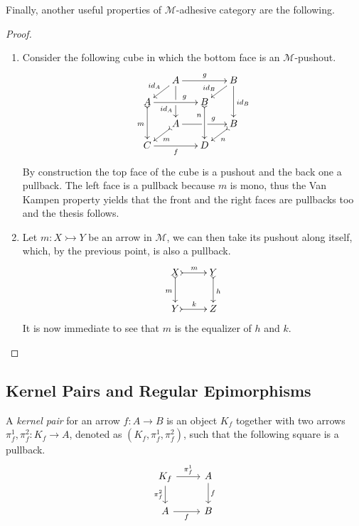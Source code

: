 \documentclass[runningheads,envcountsect]{lipics-v2021}
\def\C{\textbf {\textup{C}}}
\def\X{\textbf {\textup{X}}}
\newcommand{\mto}{\rightarrowtail}
\newcommand{\id}[1]{\mathsf{id}_{#1}}
\begin{document}
Finally, another  useful properties of $\mathcal{M}$-adhesive category are the following.
\begin{proof}
	\begin{enumerate}
		\item  Consider the following cube in which the bottom face is an $\mathcal{M}$-pushout.
		\[\xymatrix@C=15pt@R=9pt{&A\ar[dd]|\hole_(.65){\id{A}}\ar[rr]^{g} \ar[dl]_{\id{A}} && B \ar[dd]^{\id{B}} \ar[dl]_(.6){\id{B}} \\ A  \ar@{>->}[dd]_{m}\ar[rr]^(.65){g} & & B \ar@{>->}[dd]_(.3){n}\\&A\ar[rr]|\hole^(.65){g} \ar@{>->}[dl]^{m} && B \ar@{>->}[dl]^{n} \\C \ar[rr]_{f} & & D}\]
		By construction the top face of the cube is a pushout and the back one a pullback. The left face is a pullback because $m$ is mono, thus the Van Kampen property yields that the front and the right faces are pullbacks too and the thesis follows.
		\item Let $m\colon X\mto Y$ be an arrow in $\mathcal{M}$, we can then take its pushout along itself, which, by the previous point, is also a pullback.
		\[\xymatrix{X \ar@{>->}[r]^{m} \ar@{>->}[d]_{m}& Y \ar@{>->}[d]^{h}\\ Y \ar@{>->}[r]^{k} & Z}\]
		It is now immediate to see that $m$ is the equalizer of $h$ and $k$.  
	\end{enumerate}
\end{proof}

\subsection{Kernel Pairs and Regular Epimorphisms}

\begin{definition}
    A \emph{kernel pair} for an arrow $f: A \to B$ is an object $K_f$ together with two arrows $\pi^1_f, \pi^2_f : K_f \to A$, denoted as $(K_f, \pi^1_f, \pi^2_f)$, such that the following square is a pullback.
    \[
        \begin{tikzcd}
            K_f \ar[r, "{\pi^1_f}"] \ar[d, "{\pi^2_f}" swap] & A \arrow[d, "f"] \\
            A \ar[r, "f"swap] & B
        \end{tikzcd}
    \]
\end{definition}
\end{document}
